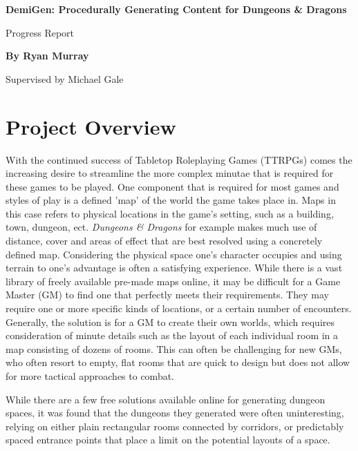 \documentclass{article}
\begin{document}
\thispagestyle{plain}
\begin{center}
    \Large
    \textbf{DemiGen: Procedurally Generating Content for Dungeons \& Dragons}
 
    \vspace{0.4cm}
    \large
    Progress Report
 
    \vspace{0.4cm}
    \textbf{By Ryan Murray}

    \vspace{0.4cm}
    \large
    Supervised by Michael Gale
\end{center}

\section{Project Overview}

With the continued success of Tabletop Roleplaying Games (TTRPGs) comes the increasing desire to streamline the more complex minutae that is required for these games to be played. One component that is required for most games and styles of play is a defined 'map' of the world the game takes place in. Maps in this case refers to physical locations in the game's setting, such as a building, town, dungeon, ect. \textit{Dungeons & Dragons} for example makes much use of distance, cover and areas of effect that are best resolved using a concretely defined map. Considering the physical space one's character occupies and using terrain to one's advantage is often a satisfying experience. While there is a vast library of freely available pre-made maps online, it may be difficult for a Game Master (GM) to find one that perfectly meets their requirements. They may require one or more specific kinds of locations, or a certain number of encounters. Generally, the solution is for a GM to create their own worlds, which requires consideration of minute details such as the layout of each individual room in a map consisting of dozens of rooms. This can often be challenging for new GMs, who often resort to empty, flat rooms that are quick to design but does not allow for more tactical approaches to combat. 



While there are a few free solutions available online for generating dungeon spaces, it was found that the dungeons they generated were often uninteresting, relying on either plain rectangular rooms connected by corridors, or predictably spaced entrance points that place a limit on the potential layouts of a space.
\end{document}
